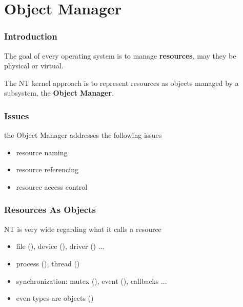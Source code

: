 %
%

\section{Object Manager}


\begin{frame}
  \frametitle{Introduction}

 The goal of every operating system is to manage \textbf{resources}, may
 they be physical or virtual.

  \-

 The NT kernel approach is to represent resources as objects managed by a
 subsystem, the \textbf{Object Manager}.

\end{frame}


\begin{frame}
  \frametitle{Issues}

  the Object Manager addresses the following issues

  \begin{itemize}
    \item
      resource naming
    \item
      resource referencing
    \item
      resource access control
 \end{itemize}
\end{frame}


\begin{frame}
  \frametitle{Resources As Objects}

  NT is very wide regarding what it calls a resource

  \begin{itemize}
    \item
      file (), device (), driver () ...
    \item
      process (), thread ()
    \item
      synchronization: mutex (), event (), callbacks ...
    \item
      even types are objects ()
  \end{itemize}

\end{frame}


